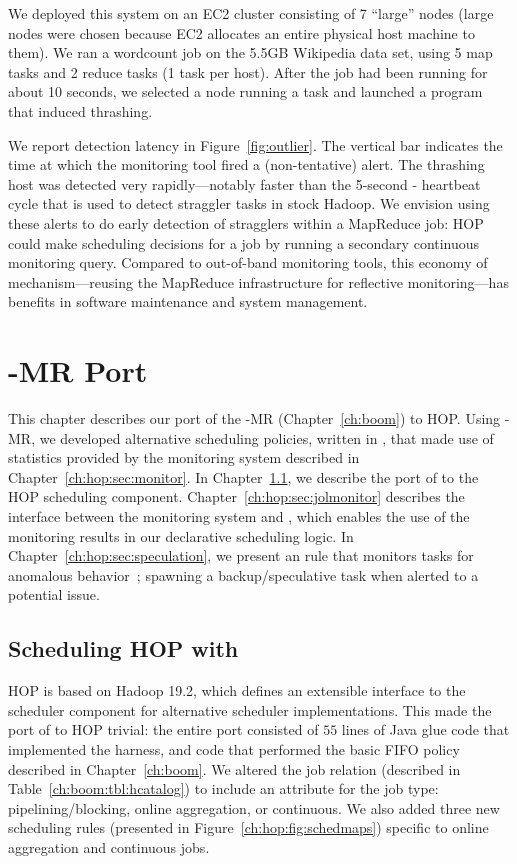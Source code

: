We deployed this system on an EC2 cluster consisting of 7 ``large''
nodes (large nodes were chosen because EC2 allocates an entire
physical host machine to them). We ran a wordcount job on the 5.5GB Wikipedia
data set, using 5 map tasks and 2 reduce tasks (1 task per host). After
the job had been running for about 10 seconds, we selected a node
running a task and launched a program that induced thrashing.

We report detection latency in Figure~\ref{fig:outlier}. The vertical bar
indicates the time at which the monitoring tool fired a (non-tentative)
alert. The thrashing host was detected very rapidly---notably faster than the
5-second {\TT}-{\JT} heartbeat cycle that is used to detect straggler tasks in
stock Hadoop. We envision using these alerts to do early detection of stragglers
within a MapReduce job: HOP could make scheduling decisions for a job by running
a secondary continuous monitoring query. Compared to out-of-band monitoring
tools, this economy of mechanism---reusing the MapReduce infrastructure for
reflective monitoring---has benefits in software maintenance and system
management.

\section{\BOOM-MR Port}
\label{ch:hop:sec:boom}

This chapter describes our port of the \BOOM-MR (Chapter~\ref{ch:boom}) to HOP.
Using \BOOM-MR, we developed alternative scheduling policies, written in
\OVERLOG, that made use of statistics provided by the monitoring system
described in Chapter~\ref{ch:hop:sec:monitor}.  In
Chapter~\ref{ch:hop:sec:jolport}, we describe the port of \JOL to the HOP \JT
scheduling component.  Chapter~\ref{ch:hop:sec:jolmonitor} describes the
interface between the monitoring system and \JOL, which enables the use of the
monitoring results in our declarative scheduling logic.  In
Chapter~\ref{ch:hop:sec:speculation}, we present an \OVERLOG rule that monitors
tasks for anomalous behavior~\cite{hopdemo}; spawning a backup/speculative task
when alerted to a potential issue.

\subsection{Scheduling HOP with \JOL}
\label{ch:hop:sec:jolport}

HOP is based on Hadoop 19.2, which defines an extensible interface to the \JT
scheduler component for alternative scheduler implementations.  This made the
port of \JOL to HOP trivial: the entire port consisted of $55$ lines of Java
glue code that implemented the \JOL harness, and \OVERLOG code that performed
the basic FIFO policy described in Chapter~\ref{ch:boom}.  We altered the job
relation (described in Table~\ref{ch:boom:tbl:hcatalog}) to include an
attribute for the job type: pipelining/blocking, online aggregation, or
continuous.  We also added three new scheduling rules (presented in
Figure~\ref{ch:hop:fig:schedmaps}) specific to online aggregation and
continuous jobs.

